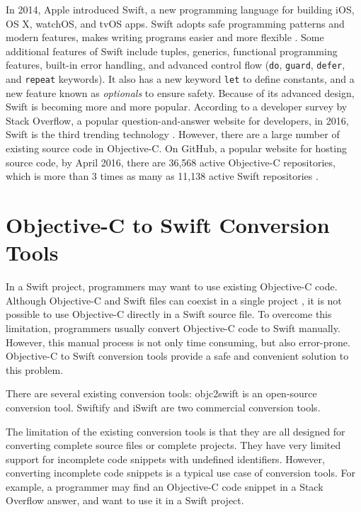 \documentclass{sfuthesis}
\begin{document}
In 2014, Apple introduced Swift, a new programming language for building iOS, OS X, watchOS, and tvOS apps. Swift adopts safe programming patterns and modern features, makes writing programs easier and more flexible \cite{aboutswift}. Some additional features of Swift include tuples, generics, functional programming features, built-in error handling, and advanced control flow (\texttt{do}, \texttt{guard}, \texttt{defer}, and \texttt{repeat} keywords). It also has a new keyword \texttt{let} to define constants, and a new feature known as \emph{optionals} to ensure safety. Because of its advanced design, Swift is becoming more and more popular. According to a developer survey by Stack Overflow, a popular question-and-answer website for developers, in 2016, Swift is the third trending technology \cite{stackoverflow2016survey}. However, there are a large number of existing source code in Objective-C. On GitHub, a popular website for hosting source code, by April 2016, there are 36,568 active Objective-C repositories, which is more than 3 times as many as 11,138 active Swift repositories \cite{githut}.

\section{Objective-C to Swift Conversion Tools}

In a Swift project, programmers may want to use existing Objective-C code. Although Objective-C and Swift files can coexist in a single project \cite{swiftandobjc}, it is not possible to use Objective-C directly in a Swift source file. To overcome this limitation, programmers usually convert Objective-C code to Swift manually. However, this manual process is not only time consuming, but also error-prone. Objective-C to Swift conversion tools provide a safe and convenient solution to this problem. 

There are several existing conversion tools: objc2swift \cite{objc2swift} is an open-source conversion tool. Swiftify \cite{swiftify} and iSwift \cite{iswift} are two commercial conversion tools.

The limitation of the existing conversion tools is that they are all designed for converting complete source files or complete projects. They have very limited support for incomplete code snippets with undefined identifiers. However, converting incomplete code snippets is a typical use case of conversion tools. For example, a programmer may find an Objective-C code snippet in a Stack Overflow answer, and want to use it in a Swift project.
\end{document}
